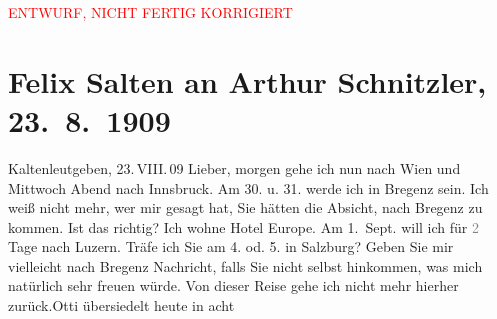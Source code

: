 
\begin{center}
            \textcolor{red}{ENTWURF, NICHT FERTIG KORRIGIERT}
                      \end{center}
            
         
         \renewcommand{\erwaehntePersonen}{Personen: Anna Katharina Rehmann, Ottilie Salten, Paul Salten, Heinrich Schnitzler, Lili Schnitzler, Olga Schnitzler}
         \renewcommand{\erwaehnteOrte}{Orte: Bregenz, Gütsch, Hotel de l’Europe, Innsbruck, Kaltenleutgeben, Salzburg, Wien}
         \renewcommand{\erwaehnteWerke}{}
               \section[Felix Salten an Arthur Schnitzler, 23. 8. 1909]{ Felix Salten an Arthur Schnitzler, 23. 8. 1909}\nopagebreak{}\rehead{ }\begin{ledgroupsized}[t]{13cm}\normalsize\beginnumbering \toendnotes[C]{\smallbreak\pagebreak[2]} 
\toendnotes[C]{\smallbreak}\pstart
           \raggedleft{}{\pb}Kaltenleutgeben, 23. VIII. 09\pend
           \pstart
           Lieber, morgen gehe ich nun nach Wien und Mittwoch Abend nach Innsbruck.
               Am 30. u. 31. werde ich in Bregenz sein. Ich weiß nicht mehr, wer mir gesagt hat, Sie hätten die
               Absicht, nach Bregenz zu kommen. Ist das
               richtig? Ich wohne Hotel Europe. Am 1. Sept. will ich
               für \textcolor{gray}{2} Tage nach Luzern. Träfe ich Sie
               am 4. od. 5. in Salzburg? Geben Sie mir vielleicht
               nach Bregenz Nachricht, falls Sie nicht selbst
               hinkommen, was mich natürlich sehr freuen würde. Von dieser Reise gehe ich nicht mehr
               hierher zurück.Otti übersiedelt heute in acht

\end{ledgroupsized}
